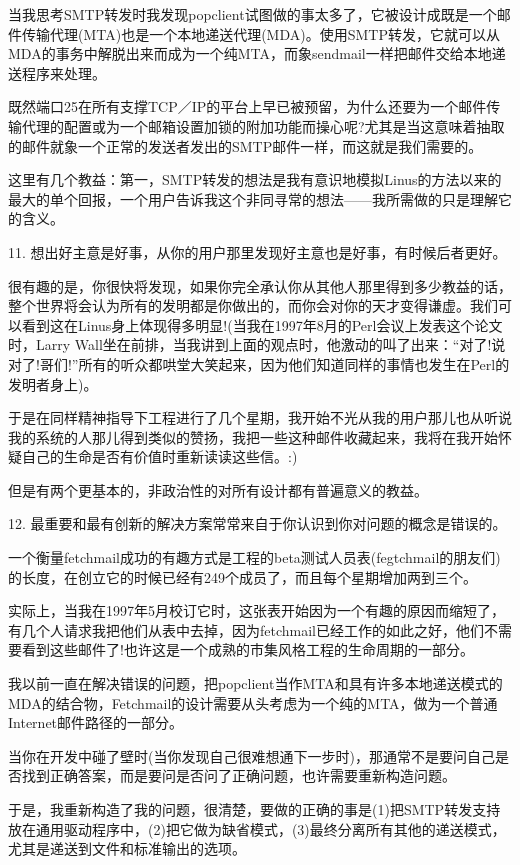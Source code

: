 \documentclass[a4paper,12pt,UTF8,twoside]{ctexbook}
\begin{document}
当我思考SMTP转发时我发现popclient试图做的事太多了，它被设计成既是一个邮件传输代理(MTA)也是一个本地递送代理(MDA)。使用SMTP转发，它就可以从MDA的事务中解脱出来而成为一个纯MTA，而象sendmail一样把邮件交给本地递送程序来处理。


既然端口25在所有支撑TCP／IP的平台上早已被预留，为什么还要为一个邮件传输代理的配置或为一个邮箱设置加锁的附加功能而操心呢?尤其是当这意味着抽取的邮件就象一个正常的发送者发出的SMTP邮件一样，而这就是我们需要的。


这里有几个教益：第一，SMTP转发的想法是我有意识地模拟Linus的方法以来的最大的单个回报，一个用户告诉我这个非同寻常的想法——我所需做的只是理解它的含义。


11. 想出好主意是好事，从你的用户那里发现好主意也是好事，有时候后者更好。


很有趣的是，你很快将发现，如果你完全承认你从其他人那里得到多少教益的话，整个世界将会认为所有的发明都是你做出的，而你会对你的天才变得谦虚。我们可以看到这在Linus身上体现得多明显!(当我在1997年8月的Perl会议上发表这个论文时，Larry Wall坐在前排，当我讲到上面的观点时，他激动的叫了出来：“对了!说对了!哥们!”所有的听众都哄堂大笑起来，因为他们知道同样的事情也发生在Perl的发明者身上)。


于是在同样精神指导下工程进行了几个星期，我开始不光从我的用户那儿也从听说我的系统的人那儿得到类似的赞扬，我把一些这种邮件收藏起来，我将在我开始怀疑自己的生命是否有价值时重新读读这些信。:)


但是有两个更基本的，非政治性的对所有设计都有普遍意义的教益。


12. 最重要和最有创新的解决方案常常来自于你认识到你对问题的概念是错误的。

一个衡量fetchmail成功的有趣方式是工程的beta测试人员表(fegtchmail的朋友们)的长度，在创立它的时候已经有249个成员了，而且每个星期增加两到三个。


实际上，当我在1997年5月校订它时，这张表开始因为一个有趣的原因而缩短了，有几个人请求我把他们从表中去掉，因为fetchmail已经工作的如此之好，他们不需要看到这些邮件了!也许这是一个成熟的市集风格工程的生命周期的一部分。

我以前一直在解决错误的问题，把popclient当作MTA和具有许多本地递送模式的MDA的结合物，Fetchmail的设计需要从头考虑为一个纯的MTA，做为一个普通Internet邮件路径的一部分。


当你在开发中碰了壁时(当你发现自己很难想通下一步时)，那通常不是要问自己是否找到正确答案，而是要问是否问了正确问题，也许需要重新构造问题。


于是，我重新构造了我的问题，很清楚，要做的正确的事是(1)把SMTP转发支持放在通用驱动程序中，(2)把它做为缺省模式，(3)最终分离所有其他的递送模式，尤其是递送到文件和标准输出的选项。
\end{document}
